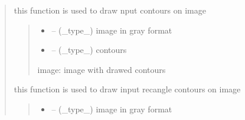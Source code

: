 \documentclass[letterpaper,10pt,english]{sphinxmanual}
\begin{document}
\begin{quote}
\begin{savenotes}\begin{fulllineitems}
\label{\detokenize{setting/backend/pxvalue_calibration:oxin.backend.pxvalue_calibration.draw_contour}}
\pysigstartsignatures
{}
\pysigstopsignatures
\sphinxAtStartPar
this function is used to draw nput contours on image
\begin{quote}\begin{description}
\begin{itemize}
\item {} 
\sphinxAtStartPar
{} – (\_type\_) image in gray format

\item {} 
\sphinxAtStartPar
{} – (\_type\_) contours

\end{itemize}

\sphinxAtStartPar
image: image with drawed contours

\end{description}\end{quote}

\end{fulllineitems}\end{savenotes}


\begin{savenotes}\begin{fulllineitems}
\label{\detokenize{setting/backend/pxvalue_calibration:oxin.backend.pxvalue_calibration.draw_rect}}
\pysigstartsignatures
{}
\pysigstopsignatures
\sphinxAtStartPar
this function is used to draw input recangle contours on image
\begin{quote}\begin{description}
\begin{itemize}
\item {} 
\sphinxAtStartPar
{} – (\_type\_) image in gray format


\end{itemize}
\end{description}
\end{quote}
\end{fulllineitems}
\end{savenotes}
\end{quote}
\end{document}
